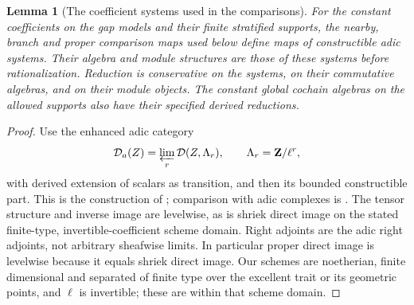 \documentclass[11pt]{article}
\newtheorem{lemma}[theorem]{Lemma}
\theoremstyle{definition}
\theoremstyle{remark}
\begin{document}
\begin{lemma}[The coefficient systems used in the comparisons]
\label{lem:selected-adic-comparisons}
For the constant coefficients on the gap models and their finite
stratified supports, the nearby, branch and proper comparison maps
used below define maps of constructible adic systems.  Their algebra
and module structures are those of these systems before rationalization.
Reduction is conservative on the systems, on their commutative algebras,
and on their module objects.  The constant global cochain algebras on
the allowed supports also have their specified derived reductions.
\end{lemma}
\begin{proof}
Use the enhanced adic category
\[
 \mathcal D_a(Z)=\varprojlim_r\mathcal D(Z,\Lambda_r),\qquad
 \Lambda_r=\mathbf Z/\ell^r,
\]
with derived extension of scalars as transition, and then its bounded
constructible part.  This is the construction of
\cite[\S1.2, (1.1)--(1.7), Proposition 1.2.1]{LZAdic}; comparison with
adic complexes is \cite[Theorem 1.3.6]{LZAdic}.  The tensor structure
and inverse image are levelwise, as is shriek direct image on the
stated finite-type, invertible-coefficient scheme domain.  Right
adjoints are the adic right adjoints, not arbitrary sheafwise limits.
In particular proper direct image is levelwise because it equals
shriek direct image.  Our schemes are noetherian, finite dimensional
and separated of finite type over the excellent trait or its geometric
points, and $\ell$ is invertible; these are within that scheme domain.


\end{proof}
\end{document}
